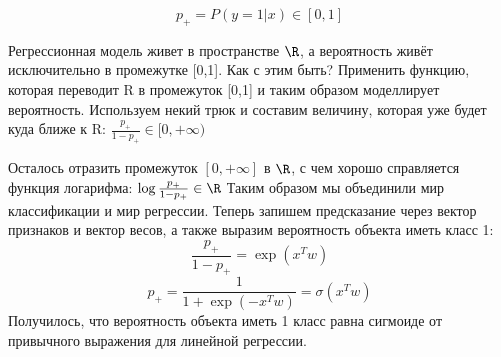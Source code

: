 \[
p_+ = P(y = 1|x) \in [0, 1]
\]

Регрессионная модель живет в пространстве $\R$, а вероятность живёт исключительно в промежутке [0,1]. Как с этим быть?
Применить функцию, которая переводит R в промежуток [0,1] и таким образом моделлирует вероятность.
Используем некий трюк и составим величину, которая уже будет куда ближе к R:
$\frac{p_+}{1 - p_+} \in [0, +\infty)$

Осталось отразить промежуток $[0, +\infty]$ в $\R$, с чем хорошо справляется функция логарифма:
$\log \frac{p_+}{1 - p_+} \in \R$
Таким образом мы объединили мир классификации и мир регрессии. Теперь запишем предсказание через
вектор признаков и вектор весов, а также выразим вероятность объекта иметь класс 1:
\[
\frac{p_+}{1 - p_+} = \exp(x^T w)
\]
\[
p_+ = \frac{1}{1 + \exp(-x^T w)} = \sigma(x^T w)
\]
Получилось, что вероятность объекта иметь 1 класс равна сигмоиде от привычного выражения для линейной
регрессии.
